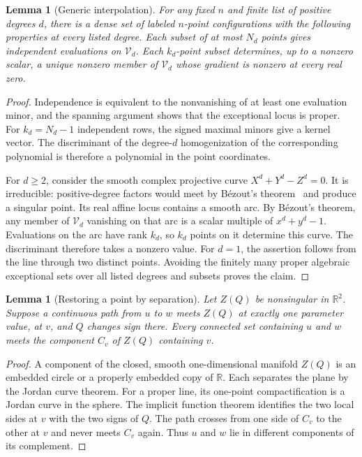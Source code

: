 \documentclass[11pt,letterpaper]{article}
\newcommand{\R}{\mathbb R}
\newcommand{\Vd}{\mathcal V_d}
\newtheorem{lemma}[theorem]{Lemma}
\begin{document}
\begin{lemma}[Generic interpolation]\label{lem:generic}
For any fixed $n$ and finite list of positive degrees $d$, there is a dense set of labeled $n$-point configurations with the following properties at every listed degree. Each subset of at most $N_d$ points gives independent evaluations on $\Vd$. Each $k_d$-point subset determines, up to a nonzero scalar, a unique nonzero member of $\Vd$ whose gradient is nonzero at every real zero.
\end{lemma}
\begin{proof}
Independence is equivalent to the nonvanishing of at least one evaluation minor, and the spanning argument shows that the exceptional locus is proper. For $k_d=N_d-1$ independent rows, the signed maximal minors give a kernel vector. The discriminant of the degree-$d$ homogenization of the corresponding polynomial is therefore a polynomial in the point coordinates.

For $d\geq2$, consider the smooth complex projective curve $X^d+Y^d-Z^d=0$. It is irreducible: positive-degree factors would meet by B\'ezout's theorem~\cite{fulton} and produce a singular point. Its real affine locus contains a smooth arc. By B\'ezout's theorem, any member of $\Vd$ vanishing on that arc is a scalar multiple of $x^d+y^d-1$. Evaluations on the arc have rank $k_d$, so $k_d$ points on it determine this curve. The discriminant therefore takes a nonzero value. For $d=1$, the assertion follows from the line through two distinct points. Avoiding the finitely many proper algebraic exceptional sets over all listed degrees and subsets proves the claim.
\end{proof}

\begin{lemma}[Restoring a point by separation]\label{lem:separation}
Let $Z(Q)$ be nonsingular in $\R^2$. Suppose a continuous path from $u$ to $w$ meets $Z(Q)$ at exactly one parameter value, at $v$, and $Q$ changes sign there. Every connected set containing $u$ and $w$ meets the component $C_v$ of $Z(Q)$ containing $v$.
\end{lemma}
\begin{proof}
A component of the closed, smooth one-dimensional manifold $Z(Q)$ is an embedded circle or a properly embedded copy of $\R$. Each separates the plane by the Jordan curve theorem. For a proper line, its one-point compactification is a Jordan curve in the sphere. The implicit function theorem identifies the two local sides at $v$ with the two signs of $Q$. The path crosses from one side of $C_v$ to the other at $v$ and never meets $C_v$ again. Thus $u$ and $w$ lie in different components of its complement.
\end{proof}
\end{document}
